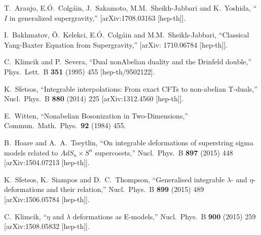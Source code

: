 \documentclass[12pt]{article}
\begin{document}
\begin{thebibliography}{99}
{      %
     T.~Araujo, E.\'{O}.~Colgáin, J.~Sakamoto, M.M.~Sheikh-Jabbari and K.~Yoshida,
      ``$I$ in generalized supergravity,''
      [arXiv:1708.03163 [hep-th]].
      
      
      I.~Bakhmatov, \"{O}.~Kelekci, E.\'O.~Colgáin and M.M.~Sheikh-Jabbari,
      ``Classical Yang-Baxter Equation from Supergravity,''
      [arXiv: 1710.06784  [hep-th]].

  C.~Klimcik and P.~Severa,
 ``Dual nonAbelian duality and the Drinfeld double,''
  Phys.\ Lett.\ B {\bf 351} (1995) 455
  [hep-th/9502122].
  
  
  K.~Sfetsos,
  ``Integrable interpolations: From exact CFTs to non-abelian T-duals,''
  Nucl.\ Phys.\ B {\bf 880} (2014) 225
  [arXiv:1312.4560 [hep-th]].
  
  E.~Witten,
  ``Nonabelian Bosonization in Two-Dimensions,''
  Commun.\ Math.\ Phys.\  {\bf 92} (1984) 455.
  
 
  B.~Hoare and A.~A.~Tseytlin,
  ``On integrable deformations of superstring sigma models related to $AdS_n \times S^n$ supercosets,''
  Nucl.\ Phys.\ B {\bf 897} (2015) 448
  [arXiv:1504.07213 [hep-th]].
  
  K.~Sfetsos, K.~Siampos and D.~C.~Thompson,
  ``Generalised integrable $\lambda$- and $\eta$-deformations and their relation,''
  Nucl.\ Phys.\ B {\bf 899} (2015) 489
  [arXiv:1506.05784 [hep-th]].

  C.~Klimcik,
  ``$\eta$ and $\lambda$ deformations as E-models,''
  Nucl.\ Phys.\ B {\bf 900} (2015) 259
  [arXiv:1508.05832 [hep-th]].
  
}
\end{thebibliography}
\end{document}
